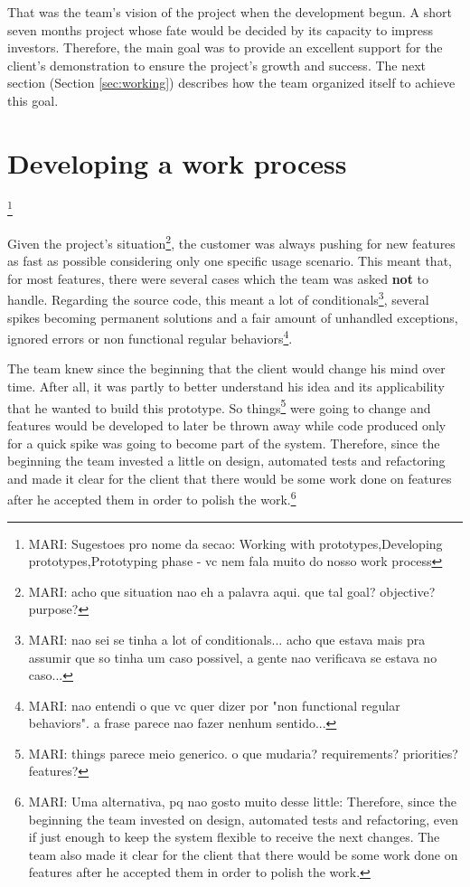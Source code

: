 \documentclass[lnbip]{svmultln}
\newcommand{\mari}[1]{\footnote{MARI: #1}}
\begin{document}
That was the team's vision of the project when the development
begun. A short seven months project whose fate would be decided by its
capacity to impress investors. Therefore, the main goal was to provide
an excellent support for the client's demonstration to ensure the
project's growth and success. The next section (Section
\ref{sec:working}) describes how the team organized itself to achieve
this goal.

\section{Developing a work process}\mari{Sugestoes pro nome da secao: Working with prototypes,Developing prototypes,Prototyping phase - vc nem fala muito do nosso work process}
\label{sec:working}

Given the project's situation\mari{acho que situation nao eh a palavra aqui. que tal goal? objective? purpose?}, the customer was always pushing for new features as fast as possible considering only one specific usage scenario. This meant that, for most features, there were several cases which the team was asked \textbf{not} to handle. Regarding the source code, this meant a lot of conditionals\mari{nao sei se tinha a lot of conditionals... acho que estava mais pra assumir que so tinha um caso possivel, a gente nao verificava se estava no caso...}, several spikes becoming permanent solutions and a fair amount of unhandled exceptions, ignored errors or non functional regular behaviors\mari{nao entendi o que vc quer dizer por "non functional regular behaviors". a frase parece nao fazer nenhum sentido...}.

The team knew since the beginning that the client would change his mind over time. After all, it was partly to better understand his idea and its applicability that he wanted to build this prototype. So things\mari{things parece meio generico. o que mudaria? requirements? priorities? features?} were going to change and features would be developed to later be thrown away while code produced only for a quick spike was going to become part of the system. Therefore, since the beginning the team invested a little on design, automated tests and refactoring and made it clear for the client that there would be some work done on features after he accepted them in order to polish the work.\mari{Uma alternativa, pq nao gosto muito desse little: Therefore, since the beginning the team invested on design, automated tests and refactoring, even if just enough to keep the system flexible to receive the next changes. The team also made it clear for the client that there would be some work done on features after he accepted them in order to polish the work.}
\end{document}
